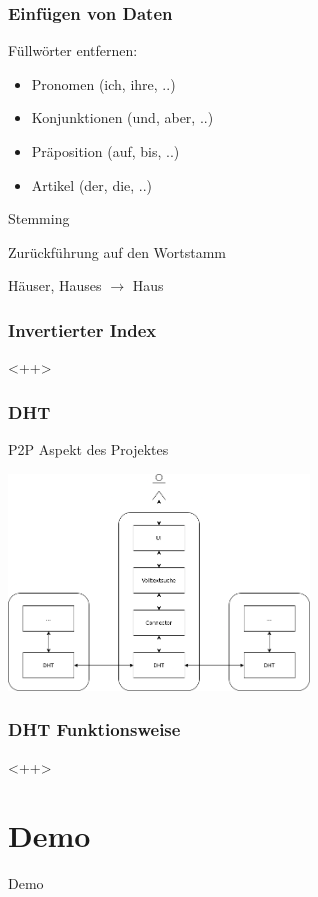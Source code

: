 \documentclass{beamer}
\begin{document}
\begin{frame}[allowframebreaks]
  \frametitle{Einfügen von Daten}

  Füllwörter entfernen:

  \begin{itemize}
    \item Pronomen (ich, ihre, ..)
    \item Konjunktionen (und, aber, ..)
    \item Präposition (auf, bis, ..)
    \item Artikel (der, die, ..)
  \end{itemize}

  \break

  Stemming

  \bigskip

  Zurückführung auf den Wortstamm

  \medskip

  Häuser, Hauses $\rightarrow$ Haus
\end{frame}

\begin{frame}
  \frametitle{Invertierter Index}

  <++>
\end{frame}

\begin{frame}[allowframebreaks]
  \frametitle{DHT}
  P2P Aspekt des Projektes

  \begin{center}
    \includegraphics[width=8cm]{Komponente-verbunden}
  \end{center}
\end{frame}

\begin{frame}
  \frametitle{DHT Funktionsweise}

  <++>
\end{frame}

\section{Demo}
\begin{frame}
  \begin{center}
    {\Huge Demo}
  \end{center}
\end{frame}
\end{document}
